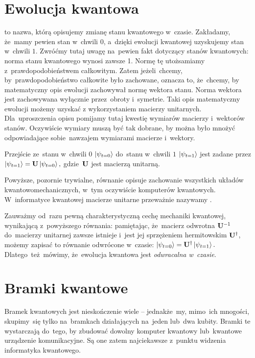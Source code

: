 \section{Ewolucja kwantowa}
to nazwa, którą opisujemy zmianę stanu kwantowego w~czasie. Zakładamy, że~mamy
pewien stan w~chwili $0$, a~dzięki ewolucji kwantowej uzyskujemy stan w~chwili $1$.
Zwróćmy tutaj uwagę na~pewien fakt dotyczący stanów kwantowych: norma stanu kwantowego wynosi zawsze 1.
Normę tę utożsamiamy z~prawdopodobieństwem całkowitym. Zatem jeżeli~chcemy, by~prawdopodobieństwo
całkowite było zachowane, oznacza to, że~chcemy, by matematyczny opis
ewolucji zachowywał normę wektora stanu. Norma wektora jest zachowywana
wyłącznie przez~obroty i~symetrie. Taki opis matematyczny ewolucji możemy uzyskać z wykorzystaniem macierzy
unitarnych. Dla~uproszczenia opisu pomijamy tutaj kwestię wymiarów macierzy
i~wektorów stanów. Oczywiście wymiary muszą być tak dobrane, by można było
mnożyć odpowiadające sobie~nawzajem wymiarami macierze i~wektory.

Przejście ze~stanu w~chwili $0$ $\ket{\psi_{t=0}}$ do~stanu w~chwili
$1$ $\ket{\psi_{t=1}}$ jest zadane przez
$
	\ket{\psi_{t=1}}= \mathbf{U}\ket{\psi_{t=0}},
$
gdzie~$\mathbf{U}$ jest macierzą unitarną.

Powyższe, pozornie trywialne, równanie opisuje zachowanie wszystkich układów kwantowomechanicznych, w~tym oczywiście
komputerów kwantowych. W~informatyce kwantowej macierze unitarne przeważnie
nazywamy .

Zauważmy od~razu pewną charakterystyczną cechę mechaniki kwantowej, wynikającą z~powyższego
równania: pamiętając, że~macierz odwrotna $\mathbf{U}^{-1}$ do~macierzy
unitarnej zawsze istnieje i~jest jej sprzężeniem hermitowskim $\mathbf{U}^\dagger$,
możemy zapisać to równanie odwrócone w~czasie:
$
	\ket{\psi_{t=0}}= \mathbf{U}^\dagger\ket{\psi_{t=1}}.
$
Dlatego~też~mówimy, że~ewolucja kwantowa jest \emph{odwracalna w~czasie}.

\section{Bramki kwantowe}
Bramek kwantowych jest nieskończenie wiele -- jednakże~my, mimo~ich mnogości,
skupimy~się tylko na~bramkach działających na~jeden lub~dwa kubity. Bramki te
wystarczają do~tego, by zbudować dowolny komputer kwantowy lub~kwantowe
urządzenie komunikacyjne. Są one zatem najciekawsze z~punktu widzenia
informatyka kwantowego.

